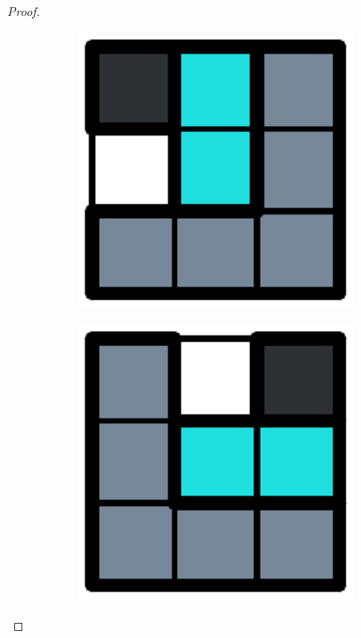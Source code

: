 \begin{proof}
\begin{figure}[h]
\begin{subfigure}[b]{0.1\textwidth}
    \caption{}
    \label{dom:turn6}
  \end{subfigure}
  \begin{subfigure}[b]{0.1\textwidth}
    \centering
    \includegraphics[width=0.9\textwidth]{pictures/dominoes/turns/turn_7.pdf}
    \caption{}
    \label{dom:turn7}
  \end{subfigure}
  \begin{subfigure}[b]{0.1\textwidth}
    \centering
    \includegraphics[width=0.9\textwidth]{pictures/dominoes/turns/turn_8.pdf}

\end{subfigure}
\end{figure}
\end{proof}
